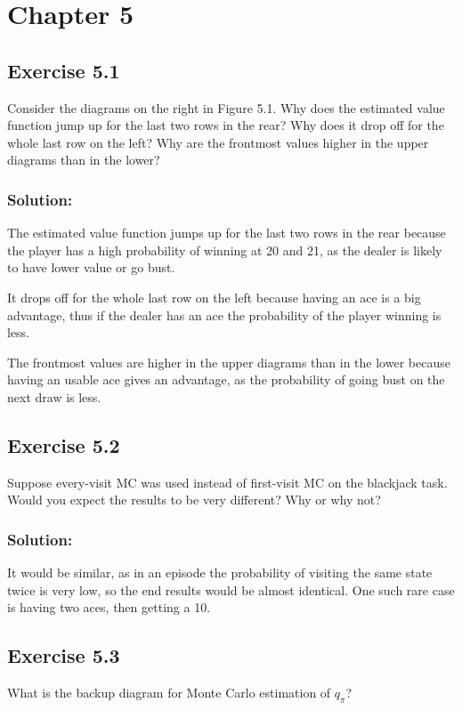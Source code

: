 \section*{Chapter 5}

\subsection*{Exercise 5.1}
Consider the diagrams on the right in Figure 5.1. Why does the estimated
value function jump up for the last two rows in the rear? Why does it drop off for the
whole last row on the left? Why are the frontmost values higher in the upper diagrams
than in the lower?

\subsubsection*{Solution:}

The estimated value function jumps up for the last two rows in the rear because the player has a high probability of winning at 20 and 21, as the dealer is likely to have lower value or go bust.

It drops off for the whole last row on the left because having an ace is a big advantage, thus if the dealer has an ace the probability of the player winning is less.

The frontmost values are higher in the upper diagrams than in the lower because having an usable ace gives an advantage, as the probability of going bust on the next draw is less.

\subsection*{Exercise 5.2}
Suppose every-visit MC was used instead of first-visit MC on the blackjack
task. Would you expect the results to be very different? Why or why not?

\subsubsection*{Solution:}
It would be similar, as in an episode the probability of visiting the same state twice is very low, so the end results would be almost identical. One such rare case is having two aces, then getting a 10.

\subsection*{Exercise 5.3}
What is the backup diagram for Monte Carlo estimation of $q_\pi$? 

